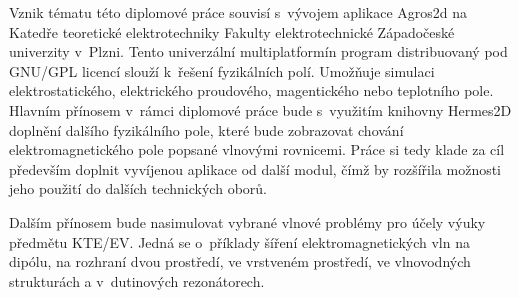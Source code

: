 Vznik tématu této diplomové práce souvisí s~vývojem aplikace Agros2d na Katedře teoretické elektrotechniky Fakulty elektrotechnické Západočeské univerzity v~Plzni. Tento univerzální multiplatformín program distribuovaný pod GNU/GPL licencí slouží k~řešení fyzikálních polí. Umožňuje simulaci elektrostatického, elektrického proudového, magentického nebo teplotního pole. Hlavním přínosem v~rámci diplomové práce bude s~využitím knihovny Hermes2D doplnění dalšího fyzikálního pole, které bude zobrazovat chování elektromagnetického pole popsané vlnovými rovnicemi. Práce si tedy klade za cíl především doplnit vyvíjenou aplikace od další modul, čímž by rozšířila možnosti jeho použití do dalších technických oborů. 

Dalším přínosem bude nasimulovat vybrané vlnové problémy pro účely výuky předmětu KTE/EV. Jedná se o~příklady šíření elektromagnetických vln na dipólu, na rozhraní dvou prostředí, ve vrstveném prostředí, ve vlnovodných strukturách a v~dutinových rezonátorech.
